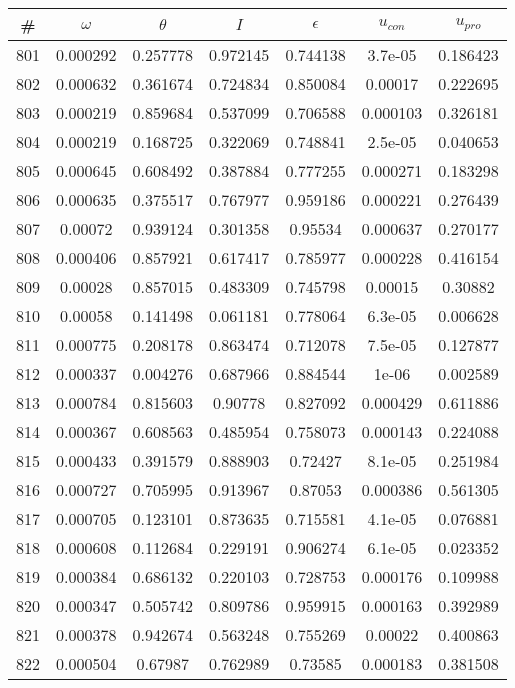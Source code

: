 \newpage
\begin{table}
\begin{tabular}{c|c|c|c|c|c|c}
\# & $\omega$ & $\theta$ & $I$ & $\epsilon$ & $u_{con}$ & $u_{pro}$\\
\hline
801 & 0.000292 & 0.257778 & 0.972145 & 0.744138 & 3.7e-05 & 0.186423\\
802 & 0.000632 & 0.361674 & 0.724834 & 0.850084 & 0.00017 & 0.222695\\
803 & 0.000219 & 0.859684 & 0.537099 & 0.706588 & 0.000103 & 0.326181\\
804 & 0.000219 & 0.168725 & 0.322069 & 0.748841 & 2.5e-05 & 0.040653\\
805 & 0.000645 & 0.608492 & 0.387884 & 0.777255 & 0.000271 & 0.183298\\
806 & 0.000635 & 0.375517 & 0.767977 & 0.959186 & 0.000221 & 0.276439\\
807 & 0.00072 & 0.939124 & 0.301358 & 0.95534 & 0.000637 & 0.270177\\
808 & 0.000406 & 0.857921 & 0.617417 & 0.785977 & 0.000228 & 0.416154\\
809 & 0.00028 & 0.857015 & 0.483309 & 0.745798 & 0.00015 & 0.30882\\
810 & 0.00058 & 0.141498 & 0.061181 & 0.778064 & 6.3e-05 & 0.006628\\
811 & 0.000775 & 0.208178 & 0.863474 & 0.712078 & 7.5e-05 & 0.127877\\
812 & 0.000337 & 0.004276 & 0.687966 & 0.884544 & 1e-06 & 0.002589\\
813 & 0.000784 & 0.815603 & 0.90778 & 0.827092 & 0.000429 & 0.611886\\
814 & 0.000367 & 0.608563 & 0.485954 & 0.758073 & 0.000143 & 0.224088\\
815 & 0.000433 & 0.391579 & 0.888903 & 0.72427 & 8.1e-05 & 0.251984\\
816 & 0.000727 & 0.705995 & 0.913967 & 0.87053 & 0.000386 & 0.561305\\
817 & 0.000705 & 0.123101 & 0.873635 & 0.715581 & 4.1e-05 & 0.076881\\
818 & 0.000608 & 0.112684 & 0.229191 & 0.906274 & 6.1e-05 & 0.023352\\
819 & 0.000384 & 0.686132 & 0.220103 & 0.728753 & 0.000176 & 0.109988\\
820 & 0.000347 & 0.505742 & 0.809786 & 0.959915 & 0.000163 & 0.392989\\
821 & 0.000378 & 0.942674 & 0.563248 & 0.755269 & 0.00022 & 0.400863\\
822 & 0.000504 & 0.67987 & 0.762989 & 0.73585 & 0.000183 & 0.381508\\

\end{tabular}
\end{table}
